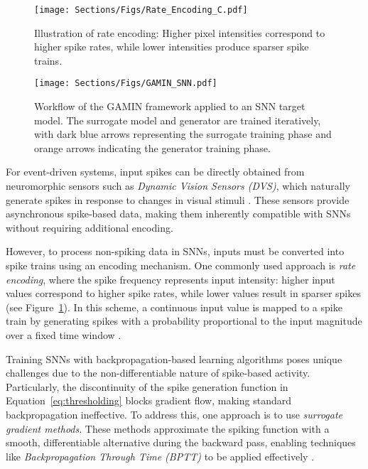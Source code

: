 \begin{figure}[t!]
  \centering
  \texttt{[image: Sections/Figs/Rate\_Encoding\_C.pdf]}
  \caption{Illustration of rate encoding: Higher pixel intensities correspond to higher spike rates, while lower intensities produce sparser spike trains.}
  \label{fig:rate_encoding}
\end{figure}

\begin{figure*}[htbp!]
  \centering
  \texttt{[image: Sections/Figs/GAMIN\_SNN.pdf]}
  \caption{Workflow of the GAMIN framework applied to an SNN target model. The surrogate model and generator are trained iteratively, with dark blue arrows representing the surrogate training phase and orange arrows indicating the generator training phase.}
  \label{fig:Gamin_SNN}
\end{figure*}


For event-driven systems, input spikes can be directly obtained from neuromorphic sensors such as \textit{Dynamic Vision Sensors (DVS)}, which naturally generate spikes in response to changes in visual stimuli \cite{hu2016dvs}. These sensors provide asynchronous spike-based data, making them inherently compatible with SNNs without requiring additional encoding.

However, to process non-spiking data in SNNs, inputs must be converted into spike trains using an encoding mechanism. One commonly used approach is \textit{rate encoding}, where the spike frequency represents input intensity: higher input values correspond to higher spike rates, while lower values result in sparser spikes (see Figure~\ref{fig:rate_encoding}).  In this scheme, a continuous input value is mapped to a spike train by generating spikes with a probability proportional to the input magnitude over a fixed time window \cite{gerstner2014neuronal}.





Training SNNs with backpropagation-based learning algorithms poses unique challenges due to the non-differentiable nature of spike-based activity. Particularly, the discontinuity of the spike generation function in Equation~\ref{eq:thresholding} blocks gradient flow, making standard backpropagation ineffective. To address this, one approach is to use \textit{surrogate gradient methods}. These methods approximate the spiking function with a smooth, differentiable alternative during the backward pass, enabling techniques like \textit{Backpropagation Through Time (BPTT)} to be applied effectively \cite{bellec2018long, neftci2019surrogate}.









